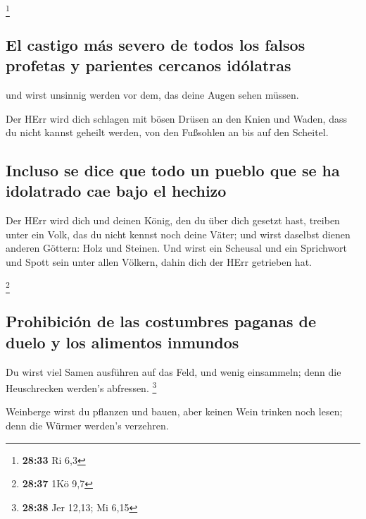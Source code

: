 \footnote{\textbf{28:33} Ri 6,3}

\hypertarget{el-castigo-muxe1s-severo-de-todos-los-falsos-profetas-y-parientes-cercanos-iduxf3latras}{%
\subsection{El castigo más severo de todos los falsos profetas y
parientes cercanos
idólatras}\label{el-castigo-muxe1s-severo-de-todos-los-falsos-profetas-y-parientes-cercanos-iduxf3latras}}

 und wirst unsinnig werden vor dem, das deine Augen sehen
müssen.

 Der HErr wird dich schlagen mit bösen Drüsen an den
Knien und Waden, dass du nicht kannst geheilt werden, von den Fußsohlen
an bis auf den Scheitel.

\hypertarget{incluso-se-dice-que-todo-un-pueblo-que-se-ha-idolatrado-cae-bajo-el-hechizo}{%
\subsection{Incluso se dice que todo un pueblo que se ha idolatrado cae
bajo el
hechizo}\label{incluso-se-dice-que-todo-un-pueblo-que-se-ha-idolatrado-cae-bajo-el-hechizo}}

 Der HErr wird dich und deinen König, den du über dich
gesetzt hast, treiben unter ein Volk, das du nicht kennst noch deine
Väter; und wirst daselbst dienen anderen Göttern: Holz und Steinen.
 Und wirst ein Scheusal und ein Sprichwort und Spott sein
unter allen Völkern, dahin dich der HErr getrieben hat.

\footnote{\textbf{28:37} 1Kö 9,7}

\hypertarget{prohibiciuxf3n-de-las-costumbres-paganas-de-duelo-y-los-alimentos-inmundos}{%
\subsection{Prohibición de las costumbres paganas de duelo y los
alimentos
inmundos}\label{prohibiciuxf3n-de-las-costumbres-paganas-de-duelo-y-los-alimentos-inmundos}}

 Du wirst viel Samen ausführen auf das Feld, und wenig
einsammeln; denn die Heuschrecken werden's abfressen. \footnote{\textbf{28:38}
  Jer 12,13; Mi 6,15}

 Weinberge wirst du pflanzen und bauen, aber keinen Wein
trinken noch lesen; denn die Würmer werden's verzehren.

